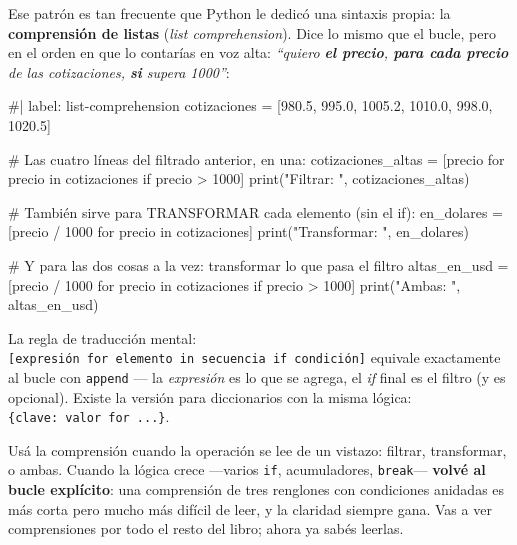 \documentclass[
  spanish,
  letterpaper,
  DIV=11,
  numbers=noendperiod]{scrreprt}
\newenvironment{Shaded}{\begin{snugshade}}{\end{snugshade}}
\newcommand{\NormalTok}[1]{\textcolor[rgb]{0.00,0.23,0.31}{#1}}
\begin{document}
Ese patrón es tan frecuente que Python le dedicó una sintaxis propia: la
\textbf{comprensión de listas} (\emph{list comprehension}). Dice lo
mismo que el bucle, pero en el orden en que lo contarías en voz alta:
\emph{``quiero \textbf{el precio}, \textbf{para cada precio} de las
cotizaciones, \textbf{si} supera 1000''}:

\begin{Shaded}
\begin{Highlighting}[]
\NormalTok{\#| label: list{-}comprehension}
\NormalTok{cotizaciones = [980.5, 995.0, 1005.2, 1010.0, 998.0, 1020.5]}

\NormalTok{\# Las cuatro líneas del filtrado anterior, en una:}
\NormalTok{cotizaciones\_altas = [precio for precio in cotizaciones if precio \textgreater{} 1000]}
\NormalTok{print("Filtrar:      ", cotizaciones\_altas)}

\NormalTok{\# También sirve para TRANSFORMAR cada elemento (sin el if):}
\NormalTok{en\_dolares = [precio / 1000 for precio in cotizaciones]}
\NormalTok{print("Transformar:  ", en\_dolares)}

\NormalTok{\# Y para las dos cosas a la vez: transformar lo que pasa el filtro}
\NormalTok{altas\_en\_usd = [precio / 1000 for precio in cotizaciones if precio \textgreater{} 1000]}
\NormalTok{print("Ambas:        ", altas\_en\_usd)}
\end{Highlighting}
\end{Shaded}

La regla de traducción mental:
\texttt{{[}expresión\ for\ elemento\ in\ secuencia\ if\ condición{]}}
equivale exactamente al bucle con \texttt{append} --- la
\emph{expresión} es lo que se agrega, el \emph{if} final es el filtro (y
es opcional). Existe la versión para diccionarios con la misma lógica:
\texttt{\{clave:\ valor\ for\ ...\}}.

\begin{tcolorbox}[enhanced jigsaw, bottomrule=.15mm, colback=white, opacitybacktitle=0.6, arc=.35mm, toprule=.15mm, opacityback=0, breakable, titlerule=0mm, left=2mm, coltitle=black, colbacktitle=quarto-callout-tip-color!10!white, colframe=quarto-callout-tip-color-frame, leftrule=.75mm, toptitle=1mm, bottomtitle=1mm, title=\textcolor{quarto-callout-tip-color}{\faLightbulb}\hspace{0.5em}{¿Comprensión o bucle explícito?}, rightrule=.15mm]

Usá la comprensión cuando la operación se lee de un vistazo: filtrar,
transformar, o ambas. Cuando la lógica crece ---varios \texttt{if},
acumuladores, \texttt{break}--- \textbf{volvé al bucle explícito}: una
comprensión de tres renglones con condiciones anidadas es más corta pero
mucho más difícil de leer, y la claridad siempre gana. Vas a ver
comprensiones por todo el resto del libro; ahora ya sabés leerlas.

\end{tcolorbox}
\end{document}

